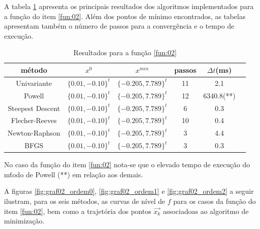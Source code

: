 \documentclass[10pt, a4paper]{article}
\begin{document}
A tabela \ref{table:resultadosf2} apresenta os principais resultados dos algoritmos implementados para a fun\c c\~ao do item \ref{fun:02}. Al\'em dos pontos de m\'inimo encontrados, as tabelas apresentam tamb\'em o n\'umero de passos para a converg\^encia e o tempo de execu\c c\~ao.

\begin{table}[H]
      \small
      \centering
      \caption{Resultados para a fun\c c\~ao \ref{fun:02}}
      \begin{tabular}{c|c|c|c|c|c}
            m\'etodo           & $x^0$ & $x^{min}$ & passos & $\Delta t$(ms) \\
            \hline
            Univariante         & $\{0.01,-0.10\}^t$     & $\{-0.205,7.789\}^t$  & 11 & 2.1 \\
            Powell              & $\{0.01,-0.10\}^t$     & $\{-0.205,7.789\}^t$  & 12 & 6340.8(**)  \\
            Steepest Descent    & $\{0.01,-0.10\}^t$     & $\{-0.205,7.789\}^t$  &  6 & 0.3 \\
            Flecher-Reeves      & $\{0.01,-0.10\}^t$     & $\{-0.205,7.789\}^t$  & 10 & 0.4 \\
            Newton-Raphson      & $\{0.01,-0.10\}^t$     & $\{-0.205,7.789\}^t$  &  3 & 4.4 \\
            BFGS                & $\{0.01,-0.10\}^t$     & $\{-0.205,7.789\}^t$  &  3 & 0.3 \\
     \end{tabular}
      \label{table:resultadosf2}
\end{table}

No caso da fun\c c\~ao do item \ref{fun:02} nota-se que o elevado tempo de execu\c c\~ao do m\'todo de Powell (**) em rela\c c\~ao aos demais.

A figuras \ref{fig:graf02_ordem0}, \ref{fig:graf02_ordem1} e \ref{fig:graf02_ordem2} a seguir ilustram, para os seis m\'etodos, as curvas de n\'ivel de $f$ para os casos da fun\c c\~ao do item \ref{fun:02}, bem como a trajet\'oria dos pontos $\vec{x_{k}}$ associadoas ao algoritmo de minimiza\c c\~ao.
\end{document}

